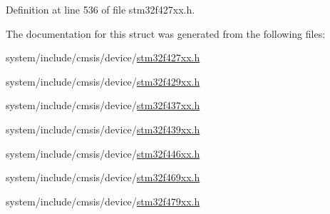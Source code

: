 Definition at line 536 of file stm32f427xx.\+h.



The documentation for this struct was generated from the following files\+:\begin{DoxyCompactItemize}
\item 
system/include/cmsis/device/\hyperlink{stm32f427xx_8h}{stm32f427xx.\+h}\item 
system/include/cmsis/device/\hyperlink{stm32f429xx_8h}{stm32f429xx.\+h}\item 
system/include/cmsis/device/\hyperlink{stm32f437xx_8h}{stm32f437xx.\+h}\item 
system/include/cmsis/device/\hyperlink{stm32f439xx_8h}{stm32f439xx.\+h}\item 
system/include/cmsis/device/\hyperlink{stm32f446xx_8h}{stm32f446xx.\+h}\item 
system/include/cmsis/device/\hyperlink{stm32f469xx_8h}{stm32f469xx.\+h}\item 
system/include/cmsis/device/\hyperlink{stm32f479xx_8h}{stm32f479xx.\+h}\end{DoxyCompactItemize}
